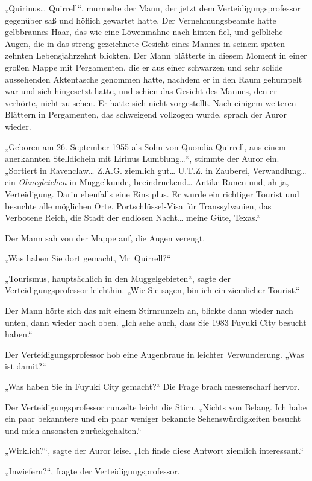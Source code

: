 {„Quirinus… Quirrell“, murmelte der Mann, der jetzt dem Verteidigungsprofessor gegenüber saß und höflich gewartet hatte. Der Vernehmungsbeamte hatte gelbbraunes Haar, das wie eine Löwenmähne nach hinten fiel, und gelbliche Augen, die in das streng gezeichnete Gesicht eines Mannes in seinem späten zehnten Lebensjahrzehnt blickten. Der Mann blätterte in diesem Moment in einer großen Mappe mit Pergamenten, die er aus einer schwarzen und sehr solide aussehenden Aktentasche genommen hatte, nachdem er in den Raum gehumpelt war und sich hingesetzt hatte, und schien das Gesicht des Mannes, den er verhörte, nicht zu sehen. Er hatte sich nicht vorgestellt. Nach einigem weiteren Blättern in Pergamenten, das schweigend vollzogen wurde, sprach der Auror wieder.

„Geboren am 26. September 1955 als Sohn von Quondia Quirrell, aus einem anerkannten Stelldichein mit Lirinus Lumblung…“, stimmte der Auror ein. „Sortiert in Ravenclaw… Z.A.G. ziemlich gut… U.T.Z. in Zauberei, Verwandlung… ein \emph{Ohnegleichen} in Muggelkunde, beeindruckend… Antike Runen und, ah ja, Verteidigung. Darin ebenfalls eine Eins plus. Er wurde ein richtiger Tourist und besuchte alle möglichen Orte. Portschlüssel-Visa für Transsylvanien, das Verbotene Reich, die Stadt der endlosen Nacht… meine Güte, Texas.“

Der Mann sah von der Mappe auf, die Augen verengt.

„Was haben Sie dort gemacht, Mr~Quirrell?“

„Tourismus, hauptsächlich in den Muggelgebieten“, sagte der Verteidigungsprofessor leichthin. „Wie Sie sagen, bin ich ein ziemlicher Tourist.“

Der Mann hörte sich das mit einem Stirnrunzeln an, blickte dann wieder nach unten, dann wieder nach oben. „Ich sehe auch, dass Sie 1983 Fuyuki City besucht haben.“

Der Verteidigungsprofessor hob eine Augenbraue in leichter Verwunderung. „Was ist damit?“

„Was haben Sie in Fuyuki City gemacht?“ Die Frage brach messerscharf hervor.

Der Verteidigungsprofessor runzelte leicht die Stirn. „Nichts von Belang. Ich habe ein paar bekanntere und ein paar weniger bekannte Sehenswürdigkeiten besucht und mich ansonsten zurückgehalten.“

„Wirklich?“, sagte der Auror leise. „Ich finde diese Antwort ziemlich interessant.“

„Inwiefern?“, fragte der Verteidigungsprofessor.

}
